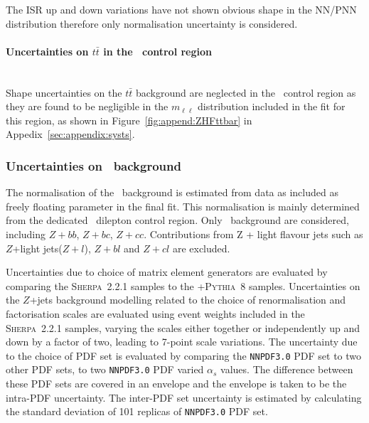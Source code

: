 The ISR up and down variations have not shown obvious shape 
in the NN/PNN distribution therefore only normalisation uncertainty is considered. 


\paragraph{Uncertainties on $t\bar{t}$ in the \ZHF\ control region}\mbox{}\\

Shape uncertainties on the $t\bar{t}$ background are neglected in the \ZHF\ 
control region as they are found to be negligible 
in the $m_{\ell\ell}$ distribution included in the 
fit for this region, as shown in Figure~\ref{fig:append:ZHFttbar} in 
Appedix~\ref{sec:appendix:systs}.





\subsubsection{Uncertainties on \texorpdfstring{\ZHF}{Z+HF}\ background}
\label{sec:DiHiggs:ZHFsysts}
The normalisation of the \ZHF\ background is estimated 
from data as included as freely floating parameter in 
the final fit. This normalisation is mainly determined 
from the dedicated \ZHF\ dilepton control region.
Only \ZHF\ background are considered, 
including $Z+bb$, $Z+bc$, $Z+cc$. 
Contributions from Z + light flavour jets 
such as $Z$+light jets($Z+l$), $Z+bl$ and $Z+cl$ are excluded. 

Uncertainties due to choice of matrix element generators are evaluated
by comparing the \textsc{Sherpa}~2.2.1 samples to the
\MADGRAPH+\textsc{Pythia}~8 samples. 
Uncertainties on the $Z$+jets background modelling 
related to the choice of renormalisation and factorisation 
scales are evaluated using event weights included 
in the \textsc{Sherpa}~2.2.1 samples, varying the scales either together 
or independently up and down by a factor of two, 
leading to 7-point scale variations. 
The uncertainty due to the choice of PDF set is evaluated 
by comparing the \texttt{NNPDF3.0} PDF set to two other PDF sets,
to two \texttt{NNPDF3.0} PDF varied $\alpha_s$ values. 
The difference between these PDF sets are covered in an envelope and 
the envelope is taken to be the intra-PDF uncertainty. 
The inter-PDF set uncertainty is estimated by 
calculating the standard deviation of 101 replicas of
\texttt{NNPDF3.0} PDF set. 

